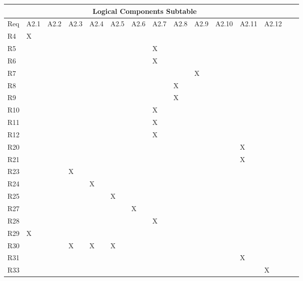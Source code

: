 \documentclass{article}
\begin{document}
\newpage
\begin{tabular}{|l|l|l|l|l|l|l|l|l|l|l|l|l|l|l|}
\hline
\multicolumn{13}{|c|}{Logical Components Subtable}\\\hline
Req& A2.1& A2.2& A2.3& A2.4& A2.5& A2.6& A2.7& A2.8& A2.9& A2.10& A2.11& A2.12\\\hline\hline
R4 &X&&&&&&&&&&& \\\hline
R5 &&&&&&&X&&&&& \\\hline
R6 &&&&&&&X&&&&& \\\hline
R7 &&&&&&&&&X&&& \\\hline
R8 &&&&&&&&X&&&& \\\hline
R9 &&&&&&&&X&&&& \\\hline
R10 &&&&&&&X&&&&& \\\hline
R11 &&&&&&&X&&&&& \\\hline
R12 &&&&&&&X&&&&& \\\hline
R20 &&&&&&&&&&&X& \\\hline
R21 &&&&&&&&&&&X& \\\hline
R23 &&&X&&&&&&&&& \\\hline
R24 &&&&X&&&&&&&& \\\hline
R25 &&&&&X&&&&&&& \\\hline
R27 &&&&&&X&&&&&& \\\hline
R28 &&&&&&&X&&&&& \\\hline
R29 &X&&&&&&&&&&& \\\hline
R30 &&&X&X&X&&&&&&& \\\hline
R31 &&&&&&&&&&&X& \\\hline
R33 &&&&&&&&&&&&X \\\hline

\end{tabular}
\end{document}
